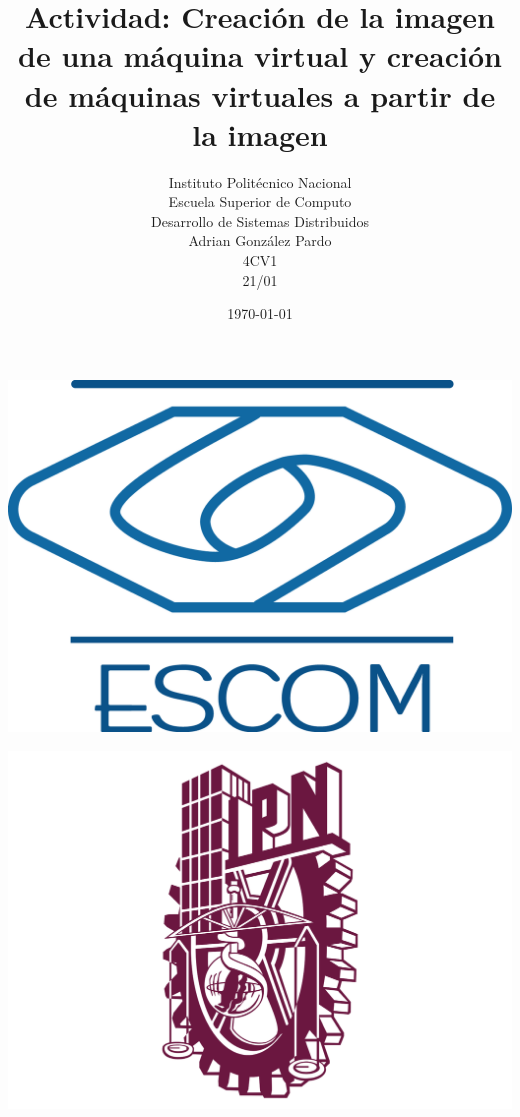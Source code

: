 \documentclass[10pt,executivepaper]{article}
\title{Actividad: Creación de la imagen de una máquina virtual y creación de máquinas virtuales a partir de la imagen}
\author{Instituto Politécnico Nacional\\Escuela Superior de Computo\\Desarrollo de Sistemas Distribuidos\\Adrian González Pardo\\4CV1\\21/01}
\date{\today}
\begin{document}
\begin{minipage}{0.4\textwidth}
	\begin{flushleft}
		\includegraphics[scale = 0.05]{logoescom.png}
	\end{flushleft}
\end{minipage}
\begin{minipage}{0.51\textwidth}
	\begin{flushright}
		\includegraphics[scale = 0.055]{logoipn.png}
	\end{flushright}
\end{minipage}
\end{document}
